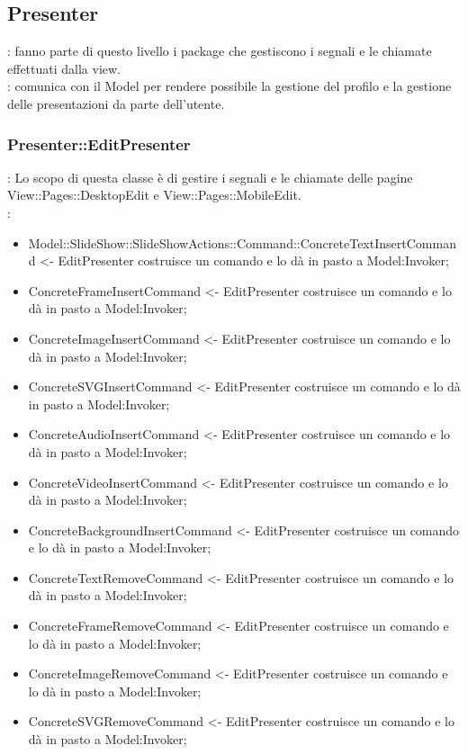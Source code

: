 \subsection{Presenter}{
	\textbf{\tipo}: fanno parte di questo livello i package che gestiscono i segnali e le chiamate effettuati dalla view.\\
	\textbf{\relaz}: comunica con il Model per rendere possibile la gestione del profilo e la gestione delle presentazioni da parte dell'utente.\\
	
	\subsubsection{Presenter::EditPresenter}{
		\textbf{\tipo}: Lo scopo di questa classe è di gestire i segnali e le chiamate delle pagine View::Pages::DesktopEdit e View::Pages::MobileEdit.\\	
		\textbf{\relaz}:
		\begin{itemize}
			\item Model::SlideShow::SlideShowActions::Command::ConcreteTextInsertCommand <- EditPresenter costruisce un comando e lo dà in pasto a Model:Invoker;
			\item ConcreteFrameInsertCommand <- EditPresenter costruisce un comando e lo dà in pasto a Model:Invoker;
			\item ConcreteImageInsertCommand <- EditPresenter costruisce un comando e lo dà in pasto a Model:Invoker;
			\item ConcreteSVGInsertCommand <- EditPresenter costruisce un comando e lo dà in pasto a Model:Invoker;
			\item ConcreteAudioInsertCommand <- EditPresenter costruisce un comando e lo dà in pasto a Model:Invoker;
			\item ConcreteVideoInsertCommand <- EditPresenter costruisce un comando e lo dà in pasto a Model:Invoker;
			\item ConcreteBackgroundInsertCommand <- EditPresenter costruisce un comando e lo dà in pasto a Model:Invoker;
			\item ConcreteTextRemoveCommand <- EditPresenter costruisce un comando e lo dà in pasto a Model:Invoker;
			\item ConcreteFrameRemoveCommand <- EditPresenter costruisce un comando e lo dà in pasto a Model:Invoker;
			\item ConcreteImageRemoveCommand <- EditPresenter costruisce un comando e lo dà in pasto a Model:Invoker;
			\item ConcreteSVGRemoveCommand <- EditPresenter costruisce un comando e lo dà in pasto a Model:Invoker;

\end{itemize}}}
